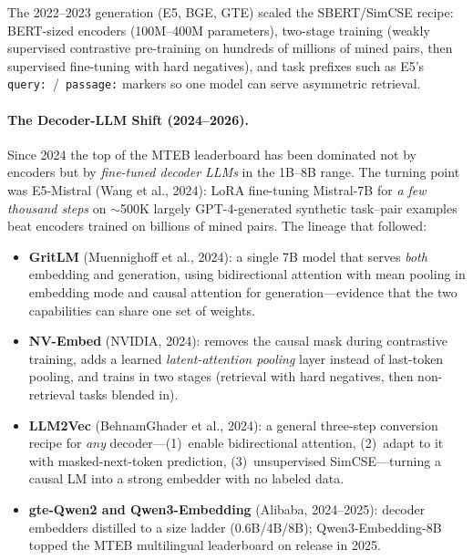 The 2022--2023 generation (E5, BGE, GTE) scaled the SBERT/SimCSE recipe:
BERT-sized encoders (100M--400M parameters), two-stage training (weakly
supervised contrastive pre-training on hundreds of millions of mined pairs,
then supervised fine-tuning with hard negatives), and task prefixes such as
E5's \texttt{query:}~/~\texttt{passage:} markers so one model can serve
asymmetric retrieval.

\paragraph{The Decoder-LLM Shift (2024--2026).}
Since 2024 the top of the MTEB leaderboard has been dominated not by encoders
but by \emph{fine-tuned decoder LLMs} in the 1B--8B range.  The turning point
was E5-Mistral (Wang et al., 2024): LoRA fine-tuning Mistral-7B for
\emph{a few thousand steps} on $\sim$500K largely GPT-4-generated synthetic
task--pair examples beat encoders trained on billions of mined pairs.
The lineage that followed:
\begin{itemize}
    \item \textbf{GritLM} (Muennighoff et al., 2024): a single 7B model
    that serves \emph{both} embedding and generation, using bidirectional
    attention with mean pooling in embedding mode and causal attention for
    generation---evidence that the two capabilities can share one set of
    weights.
    \item \textbf{NV-Embed} (NVIDIA, 2024): removes the causal mask during
    contrastive training, adds a learned \emph{latent-attention pooling}
    layer instead of last-token pooling, and trains in two stages (retrieval
    with hard negatives, then non-retrieval tasks blended in).
    \item \textbf{LLM2Vec} (BehnamGhader et al., 2024): a general
    three-step conversion recipe for \emph{any} decoder---(1)~enable
    bidirectional attention, (2)~adapt to it with masked-next-token
    prediction, (3)~unsupervised SimCSE---turning a causal LM into a strong
    embedder with no labeled data.
    \item \textbf{gte-Qwen2 and Qwen3-Embedding} (Alibaba, 2024--2025):
    decoder embedders distilled to a size ladder (0.6B/4B/8B);
    Qwen3-Embedding-8B topped the MTEB multilingual leaderboard on release
    in 2025.
\end{itemize}

